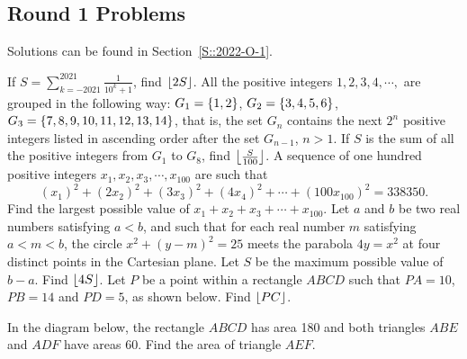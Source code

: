 \subsection{Round 1 Problems}

Solutions can be found in Section~\ref{S::2022-O-1}.

\begin{enumerate}
    \hyperrefitem[A::2022-O-1-1] If $S = \displaystyle\sum_{k = -2021}^{2021} \frac{1}{10^k + 1}$, find $\left\lfloor 2S \right\rfloor$.
    \hyperrefitem[A::2022-O-1-2] All the positive integers $1, 2, 3, 4, \cdots,$ are grouped in the following way: $G_1 = \left\lbrace 1, 2 \right\rbrace$, $G_2 = \left\lbrace 3, 4, 5, 6 \right\rbrace$, $G_3 = \left\lbrace 7, 8, 9, 10, 11, 12, 13, 14 \right\rbrace$, that is, the set $G_n$ contains the next $2^n$ positive integers listed in ascending order after the set $G_{n-1}$, $n > 1$. If $S$ is the sum of all the positive integers from $G_1$ to $G_8$, find $\left\lfloor \frac{S}{100} \right\rfloor$.
    \hyperrefitem[A::2022-O-1-3] A sequence of one hundred positive integers $x_1, x_2, x_3, \cdots, x_{100}$ are such that \[(x_1)^2 + (2x_2)^2 + (3x_3)^2 + (4x_4)^2 + \cdots + (100x_{100})^2 = 338350.\] Find the largest possible value of $x_1 + x_2 + x_3 + \cdots + x_{100}$.
    \hyperrefitem[A::2022-O-1-4] Let $a$ and $b$ be two real numbers satisfying $a < b$, and such that for each real number $m$ satisfying $a < m < b$, the circle $x^2 + (y-m)^2 = 25$ meets the parabola $4y = x^2$ at four distinct points in the Cartesian plane. Let $S$ be the maximum possible value of $b-a$. Find $\left\lfloor 4S \right\rfloor$.
    \hyperrefitem[A::2022-O-1-5] Let $P$ be a point within a rectangle $ABCD$ such that $PA = 10$, $PB = 14$ and $PD = 5$, as shown below. Find $\left\lfloor PC \right\rfloor$.
    
    \begin{center}
    \end{center}
    \hyperrefitem[A::2022-O-1-6] In the diagram below, the rectangle $ABCD$ has area 180 and both triangles $ABE$ and $ADF$ have areas 60. Find the area of triangle $AEF$.


\end{enumerate}
